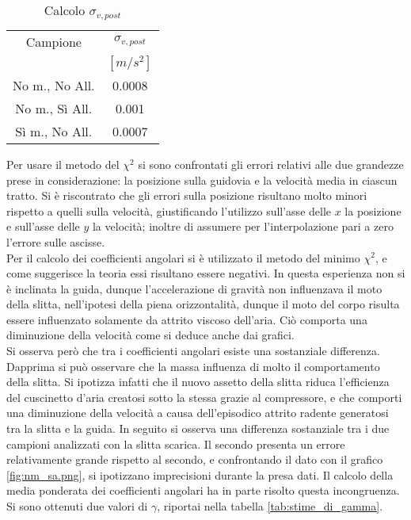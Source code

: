 \documentclass[a4paper,11pt,oneside]{article}
\begin{document}
\begin{wraptable}{l}{5cm}%
\centering
    \begin{tabular}{c|c}
        \toprule
        Campione & $\sigma_{v, post}$ \\
        & $[\si{m/s^{2}}]$\\
        \midrule
        No m., No All. &  0.0008\\
        No m., Sì All. & 0.001 \\
        Sì m., No All. & 0.0007 \\
        \bottomrule
    \end{tabular}
    \caption{Calcolo $\sigma_{v, post}$}
    \label{tab:v_post_delta_g}
\end{wraptable}

Per usare il metodo del ${\chi}^{2}$ si sono confrontati gli errori relativi alle due grandezze prese in considerazione: la posizione sulla guidovia e la velocità media in ciascun tratto. Si è riscontrato che gli errori sulla posizione risultano molto minori rispetto a quelli sulla velocità, giustificando l'utilizzo sull'asse delle $x$ la posizione e sull'asse delle $y$ la velocità; inoltre di assumere per l'interpolazione pari a zero l'errore sulle ascisse.\\
Per il calcolo dei coefficienti angolari si è utilizzato il metodo del minimo ${\chi}^{2}$, e come suggerisce la teoria essi risultano essere negativi. In questa esperienza non si è inclinata la guida, dunque l'accelerazione di gravità non influenzava il moto della slitta, nell'ipotesi della piena orizzontalità, dunque il moto del corpo risulta essere influenzato solamente da attrito viscoso dell'aria. Ciò comporta una diminuzione della velocità come si deduce anche dai grafici.\\
Si osserva però che tra i coefficienti angolari esiste una sostanziale differenza. Dapprima si può osservare che la massa influenza di molto il comportamento della slitta. Si ipotizza infatti che il nuovo assetto della  slitta riduca l'efficienza del cuscinetto d'aria creatosi sotto la stessa grazie al compressore, e che comporti una diminuzione della velocità a causa dell'episodico attrito radente generatosi tra la slitta e la guida. In seguito si osserva una differenza sostanziale tra i due campioni analizzati con la slitta scarica. Il secondo presenta un errore relativamente grande rispetto al secondo, e confrontando il dato con il grafico \ref{fig:nm_sa.png}, si ipotizzano imprecisioni durante la presa dati. Il calcolo della media ponderata dei coefficienti angolari ha in parte risolto questa incongruenza. Si sono ottenuti due valori di $\gamma$, riportai nella tabella \ref{tab:stime_di_gamma}.\\
\end{document}
